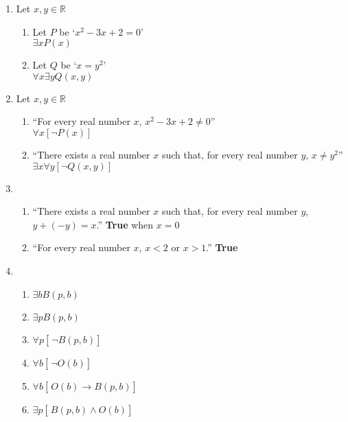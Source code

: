 \begin{enumerate}[leftmargin=2cm,labelsep=.5cm,label=\bf\arabic*.]
\item Let $x, y\in\mathbb{R}$
\begin{enumerate}
  \item Let $P$ be `$x^2-3x+2=0$'\\$\exists x P(x)$
  \item Let $Q$ be `$x=y^2$'\\$\forall x \exists y Q(x,y)$\\[5mm]
\end{enumerate}

\item Let $x, y \in\mathbb{R}$
\begin{enumerate}
  \item ``For every real number $x$, $x^2-3x+2\neq 0$''\\$\forall x[\neg P(x)]$
  \item ``There exists a real number $x$ such that, for every real number $y$, $ x\neq y^2$''\\$\exists x\forall y [\neg Q(x,y)]$\\[5mm]
\end{enumerate}

\item
\begin{enumerate}
  \item ``There exists a real number $x$ such that, for every real number $y$, $y+(-y)=x$.'' \textbf{True} when $x=0$

  \item ``For every real number $x$, $x<2$ or $x>1$.'' \textbf{True}\\[5mm]
\end{enumerate}

\item 
\begin{enumerate}
  \item $\exists b B(p,b)$ 
  \item $\exists p B(p,b)$
  \item $\forall p \left[\frac{}{}\neg B(p,b)\right]$ \addtocounter{enumii}{2}
  \item $\forall b \left[\frac{}{}\neg O(b)\right]$
  \item $\forall b \left[\frac{}{}O(b)\rightarrow B(p,b)\right]$
  \item $\exists p \left[\frac{}{}B(p,b)\wedge O(b)\right]$ \\[5mm]
\end{enumerate}


\end{enumerate}
